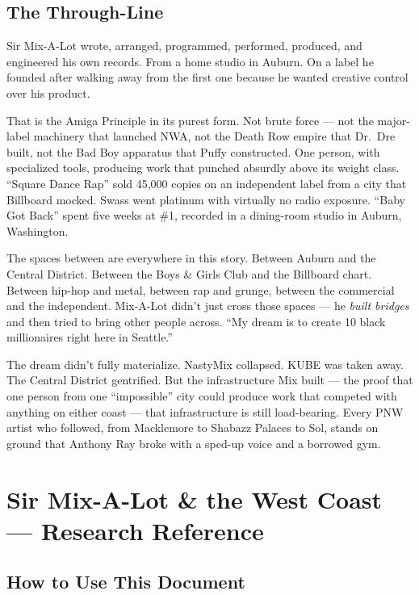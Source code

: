 \documentclass[11pt,letterpaper]{article}
\newcommand{\stageheader}[2]{\noindent\colorbox{#2}{\makebox[\textwidth][l]{\textcolor{white}{\bfseries\sffamily\hspace{6pt}#1\hspace{6pt}}}}\vspace{0.5em}\par}
\begin{document}
\subsection{The Through-Line}

Sir Mix-A-Lot wrote, arranged, programmed, performed, produced, and engineered his own records. From a home studio in Auburn. On a label he founded after walking away from the first one because he wanted creative control over his product.

That is the Amiga Principle in its purest form. Not brute force --- not the major-label machinery that launched NWA, not the Death Row empire that Dr.~Dre built, not the Bad Boy apparatus that Puffy constructed. One person, with specialized tools, producing work that punched absurdly above its weight class. ``Square Dance Rap'' sold 45,000 copies on an independent label from a city that Billboard mocked. Swass went platinum with virtually no radio exposure. ``Baby Got Back'' spent five weeks at \#1, recorded in a dining-room studio in Auburn, Washington.

The spaces between are everywhere in this story. Between Auburn and the Central District. Between the Boys \& Girls Club and the Billboard chart. Between hip-hop and metal, between rap and grunge, between the commercial and the independent. Mix-A-Lot didn't just cross those spaces --- he \textit{built bridges} and then tried to bring other people across. ``My dream is to create 10 black millionaires right here in Seattle.''

The dream didn't fully materialize. NastyMix collapsed. KUBE was taken away. The Central District gentrified. But the infrastructure Mix built --- the proof that one person from one ``impossible'' city could produce work that competed with anything on either coast --- that infrastructure is still load-bearing. Every PNW artist who followed, from Macklemore to Shabazz Palaces to Sol, stands on ground that Anthony Ray broke with a sped-up voice and a borrowed gym.

\newpage

\stageheader{STAGE 2 --- RESEARCH REFERENCE}{secondary}

\section{Sir Mix-A-Lot \& the West Coast --- Research Reference}

\subsection{How to Use This Document}
\end{document}
